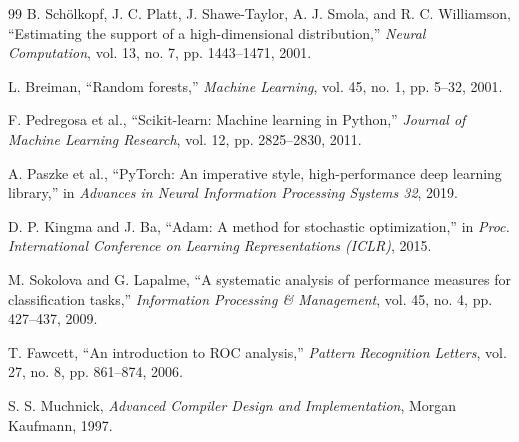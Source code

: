 \begin{thebibliography}{99}
B. Sch\"olkopf, J. C. Platt, J. Shawe-Taylor, A. J. Smola, and R. C. Williamson,
``Estimating the support of a high-dimensional distribution,''
\textit{Neural Computation}, vol. 13, no. 7, pp. 1443--1471, 2001.

L. Breiman,
``Random forests,''
\textit{Machine Learning}, vol. 45, no. 1, pp. 5--32, 2001.

F. Pedregosa et al.,
``Scikit-learn: Machine learning in Python,''
\textit{Journal of Machine Learning Research}, vol. 12, pp. 2825--2830, 2011.

A. Paszke et al.,
``PyTorch: An imperative style, high-performance deep learning library,''
in \textit{Advances in Neural Information Processing Systems 32}, 2019.

D. P. Kingma and J. Ba,
``Adam: A method for stochastic optimization,''
in \textit{Proc. International Conference on Learning Representations (ICLR)}, 2015.

M. Sokolova and G. Lapalme,
``A systematic analysis of performance measures for classification tasks,''
\textit{Information Processing \& Management}, vol. 45, no. 4, pp. 427--437, 2009.

T. Fawcett,
``An introduction to ROC analysis,''
\textit{Pattern Recognition Letters}, vol. 27, no. 8, pp. 861--874, 2006.

S. S. Muchnick,
\textit{Advanced Compiler Design and Implementation},
Morgan Kaufmann, 1997.

\end{thebibliography}
